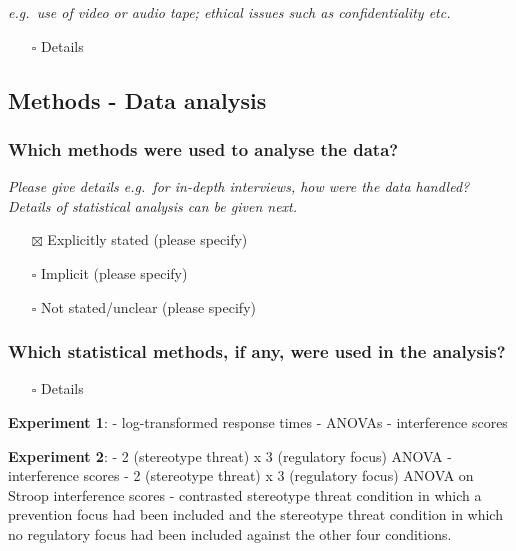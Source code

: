 \documentclass[
  doc, a4paper]{apa7}
\providecommand{\tightlist}{%
  \setlength{\itemsep}{0pt}\setlength{\parskip}{0pt}}
\begin{document}
\emph{e.g.~use of video or audio tape; ethical issues such as confidentiality etc.}

\begin{itemize}
\tightlist
\item[$\square$]
  Details
\end{itemize}

\subsection{Methods - Data analysis}\label{methods---data-analysis}

\subsubsection{Which methods were used to analyse the data?}\label{which-methods-were-used-to-analyse-the-data}

\emph{Please give details e.g.~for in-depth interviews, how were the data handled? Details of statistical analysis can be given next.}

\begin{itemize}
\tightlist
\item[$\boxtimes$]
  Explicitly stated (please specify)
\item[$\square$]
  Implicit (please specify)
\item[$\square$]
  Not stated/unclear (please specify)
\end{itemize}

\subsubsection{Which statistical methods, if any, were used in the analysis?}\label{which-statistical-methods-if-any-were-used-in-the-analysis}

\begin{itemize}
\tightlist
\item[$\square$]
  Details
\end{itemize}

\textbf{Experiment 1}:
- log-transformed response times
- ANOVAs
- interference scores

\textbf{Experiment 2}:
- 2 (stereotype threat) x 3 (regulatory focus) ANOVA
- interference scores
- 2 (stereotype threat) x 3 (regulatory focus) ANOVA on Stroop interference scores
- contrasted stereotype threat condition in which a prevention focus had been included and the stereotype threat condition in which no regulatory focus had been included against the other four conditions.
\end{document}
